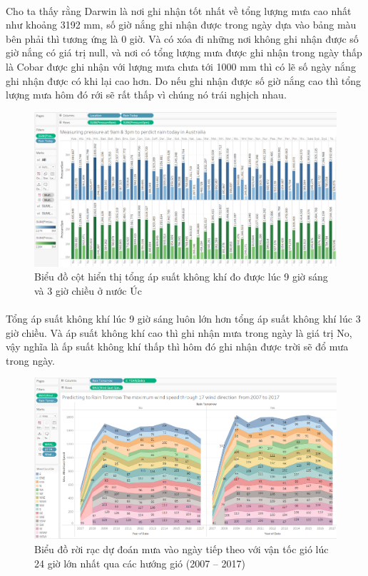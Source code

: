 \documentclass{article}
\begin{document}
\paragraph{}Cho ta thấy rằng Darwin là nơi ghi nhận tốt nhất về tổng lượng mưa cao nhất như khoảng 3192 mm, số giờ nắng ghi nhận được trong ngày dựa vào bảng màu bên phải thì tương ứng là 0 giờ. Và có xóa đi những nơi không ghi nhận được số giờ nắng có giá trị null, và nơi có tổng lượng mưa được ghi nhận trong ngày thấp là Cobar được ghi nhận với lượng mưa chưa tới 1000 mm thì có lẽ số ngày nắng ghi nhận được có khi lại cao hơn. Do nếu ghi nhận được số giờ nắng cao thì tổng lượng mưa hôm đó rới sẽ rất thấp vì chúng nó trái nghịch nhau.
\pagebreak{}
\begin{figure}[!h]
	\begin{center}
		\includegraphics[width=\linewidth]{images/tableau5.png}
		\caption{\fontsize{14}{20}\selectfont Biểu đồ cột hiển thị tổng áp suất không khí đo được lúc 9 giờ sáng và 3 giờ chiều ở nước Úc}
	\end{center}
\end{figure}
\paragraph{}Tổng áp suất không khí lúc 9 giờ sáng luôn lớn hơn tổng áp suất không khí lúc 3 giờ chiều. Và áp suất không khí cao thì ghi nhận mưa trong ngày là giá trị No, vậy nghĩa là ấp suất không khí thấp thì hôm đó ghi nhận được trời sẽ đổ mưa trong ngày.
\pagebreak{}
\begin{figure}[!h]
	\begin{center}
		\includegraphics[width=\linewidth]{images/tableau6.png}
		\caption{\fontsize{14}{20}\selectfont Biểu đồ rời rạc dự đoán mưa vào ngày tiếp theo với vận tốc gió lúc 24 giờ lớn nhất qua các hướng gió (2007 – 2017)}
	\end{center}
\end{figure}
\end{document}

